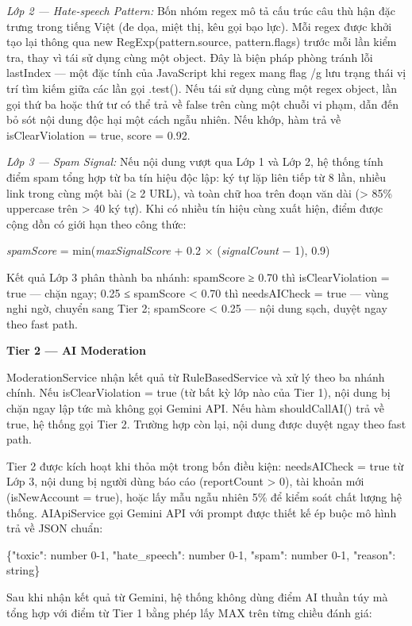 \emph{Lớp 2 --- Hate-speech Pattern:} Bốn nhóm regex mô tả cấu trúc câu
thù hận đặc trưng trong tiếng Việt (đe dọa, miệt thị, kêu gọi bạo lực).
Mỗi regex được khởi tạo lại thông qua new RegExp(pattern.source,
pattern.flags) trước mỗi lần kiểm tra, thay vì tái sử dụng cùng một
object. Đây là biện pháp phòng tránh lỗi lastIndex --- một đặc tính của
JavaScript khi regex mang flag /g lưu trạng thái vị trí tìm kiếm giữa
các lần gọi .test(). Nếu tái sử dụng cùng một regex object, lần gọi thứ
ba hoặc thứ tư có thể trả về false trên cùng một chuỗi vi phạm, dẫn đến
bỏ sót nội dung độc hại một cách ngẫu nhiên. Nếu khớp, hàm trả về
isClearViolation = true, score = 0.92.

\emph{Lớp 3 --- Spam Signal:} Nếu nội dung vượt qua Lớp 1 và Lớp 2, hệ
thống tính điểm spam tổng hợp từ ba tín hiệu độc lập: ký tự lặp liên
tiếp từ 8 lần, nhiều link trong cùng một bài (≥ 2 URL), và toàn chữ hoa
trên đoạn văn dài (\textgreater{} 85\% uppercase trên \textgreater{} 40
ký tự). Khi có nhiều tín hiệu cùng xuất hiện, điểm được cộng dồn có giới
hạn theo công thức:

\emph{spamScore} = min(\emph{maxSignalScore} + 0.2 × (\emph{signalCount}
− 1), 0.9)

Kết quả Lớp 3 phân thành ba nhánh: spamScore ≥ 0.70 thì isClearViolation
= true --- chặn ngay; 0.25 ≤ spamScore \textless{} 0.70 thì needsAICheck
= true --- vùng nghi ngờ, chuyển sang Tier 2; spamScore \textless{} 0.25
--- nội dung sạch, duyệt ngay theo fast path.

\textbf{Tier 2 --- AI Moderation}

ModerationService nhận kết quả từ RuleBasedService và xử lý theo ba
nhánh chính. Nếu isClearViolation = true (từ bất kỳ lớp nào của Tier 1),
nội dung bị chặn ngay lập tức mà không gọi Gemini API. Nếu hàm
shouldCallAI() trả về true, hệ thống gọi Tier 2. Trường hợp còn lại, nội
dung được duyệt ngay theo fast path.

Tier 2 được kích hoạt khi thỏa một trong bốn điều kiện: needsAICheck =
true từ Lớp 3, nội dung bị người dùng báo cáo (reportCount
\textgreater{} 0), tài khoản mới (isNewAccount = true), hoặc lấy mẫu
ngẫu nhiên 5\% để kiểm soát chất lượng hệ thống. AIApiService gọi Gemini
API với prompt được thiết kế ép buộc mô hình trả về JSON chuẩn:

\{"toxic": number 0-1, "hate\_speech": number 0-1, "spam": number 0-1,
"reason": string\}

Sau khi nhận kết quả từ Gemini, hệ thống không dùng điểm AI thuần túy mà
tổng hợp với điểm từ Tier 1 bằng phép lấy MAX trên từng chiều đánh giá:

